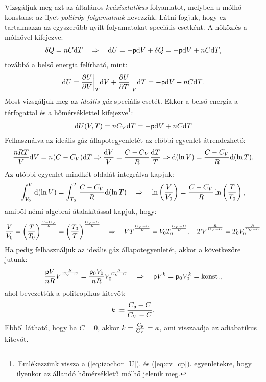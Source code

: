 Vizsgáljuk meg azt az általános \emph{kvázisztatikus} folyamatot, melyben a mólhő konstans; az ilyet \emph{politróp folyamatnak} nevezzük. Látni fogjuk, hogy ez tartalmazza az egyszerűbb nyílt folyamatokat speciális esetként. A hőközlés a mólhővel kifejezve:
\begin{align}
    \delta Q = nC\mathrm{d}T \quad\Rightarrow\quad \mathrm{d}U = -\mathsf p \mathrm{d}V + \delta Q = -\mathsf p \mathrm{d}V +nC\mathrm{d}T,
\end{align}
továbbá a belső energia felírható, mint:
\begin{align}
    \mathrm{d}U = \frac{\partial{U}}{\partial{V}}\bigg|_T \mathrm{d}V + \frac{\partial{U}}{\partial{T}}\bigg|_V \mathrm{d}T = -\mathsf p \mathrm{d}V +nC\mathrm{d}T.
\end{align}
Most vizsgáljuk meg az \emph{ideális gáz} speciális esetét. Ekkor a belső energia a térfogattal és a hőmérséklettel kifejezve\footnote{\,Emlékezzünk vissza a (\ref{eq:izochor_U}). és (\ref{eq:cv_cp}). egyenletekre, hogy ilyenkor az állandó hőmérsékletű mólhő jelenik meg.}:
\begin{align}
    \mathrm{d}U(V,T) = nC_V\mathrm{d}T = -\mathsf p\mathrm{d}V + nC\mathrm{d}T
\end{align}
Felhasználva az ideális gáz állapotegyenletét az előbbi egyenlet átrendezhető:
\begin{align}
    \frac{nRT}{V}\mathrm{d}V = n(C-C_V)\mathrm{d}T \Rightarrow \frac{\mathrm{d}V}{V}=\frac{C-C_V}{R}\frac{\mathrm{d}T}{T}\Rightarrow \mathrm{d}(\ln V) = \frac{C-C_V}{R}\mathrm{d}(\ln T).
\end{align}
Az utóbbi egyenlet mindkét oldalát integrálva kapjuk:
\begin{align}
    \int_{V_0}^V\mathrm{d}(\ln V) = \int_{T_0}^T\frac{C-C_V}{R}\mathrm{d}(\ln T)\quad\Rightarrow\quad \ln\left({\frac{V}{V_0}}\right) = \frac{C-C_V}{R}\ln\left({\frac{T}{T_0}}\right), 
\end{align}
amiből némi algebrai átalakítással kapjuk, hogy:
\begin{align}
    \frac{V}{V_0} = \z{\frac{T}{T_0}}^{\frac{C-C_V}{R}}=\z{\frac{T_0}{T}}^{\frac{C_V-C}{R}}\follows VT_{\textcolor{white}{0}}^{\frac{C_V-C}{R}}=V_0T_0^{\frac{C_V-C}{R}},\quad TV_{\textcolor{white}{0}}^{\frac{R}{C_V-C}}=T_0V_0^{\frac{R}{C_V-C}}
\end{align}
Ha pedig felhasználjuk az ideális gáz állapotegyenletét, akkor a következőre jutunk:
\begin{align}
    \frac{\pres V}{nR}V_{\textcolor{white}{0}}^{\frac{R}{C_V-C}}=\frac{\pres_0 V_0}{nR}V_0^{\frac{R}{C_V-C}}\follows \pres V^k =\pres_0V_0^k=\tn{konst.},
\end{align}
ahol bevezettük a politropikus kitevőt:
\begin{align}
    k:=\frac{C_\mathsf p-C}{C_V-C}.
\end{align}
Ebből látható, hogy ha $C=0$, akkor $k=\frac{C_\mathsf p}{C_V}=\kappa$, ami visszaadja az adiabatikus kitevőt.


